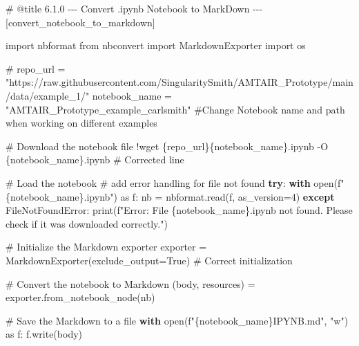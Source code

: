 \documentclass[
  11pt,
  letterpaper,
]{book}
\newenvironment{Shaded}{\begin{snugshade}}{\end{snugshade}}
\newcommand{\BuiltInTok}[1]{\textcolor[rgb]{0.00,0.23,0.31}{#1}}
\newcommand{\CommentTok}[1]{\textcolor[rgb]{0.37,0.37,0.37}{#1}}
\newcommand{\ControlFlowTok}[1]{\textcolor[rgb]{0.00,0.23,0.31}{\textbf{#1}}}
\newcommand{\DecValTok}[1]{\textcolor[rgb]{0.68,0.00,0.00}{#1}}
\newcommand{\ImportTok}[1]{\textcolor[rgb]{0.00,0.46,0.62}{#1}}
\newcommand{\NormalTok}[1]{\textcolor[rgb]{0.00,0.23,0.31}{#1}}
\newcommand{\OperatorTok}[1]{\textcolor[rgb]{0.37,0.37,0.37}{#1}}
\newcommand{\PreprocessorTok}[1]{\textcolor[rgb]{0.68,0.00,0.00}{#1}}
\newcommand{\SpecialCharTok}[1]{\textcolor[rgb]{0.37,0.37,0.37}{#1}}
\newcommand{\SpecialStringTok}[1]{\textcolor[rgb]{0.13,0.47,0.30}{#1}}
\newcommand{\StringTok}[1]{\textcolor[rgb]{0.13,0.47,0.30}{#1}}
\newcommand{\VariableTok}[1]{\textcolor[rgb]{0.07,0.07,0.07}{#1}}
\begin{document}
\label{convert_notebook_to_markdown}
\begin{Shaded}
\begin{Highlighting}[]
\CommentTok{\# @title 6.1.0 {-}{-}{-} Convert .ipynb Notebook to MarkDown {-}{-}{-} [convert\_notebook\_to\_markdown]}

\ImportTok{import}\NormalTok{ nbformat}
\ImportTok{from}\NormalTok{ nbconvert }\ImportTok{import}\NormalTok{ MarkdownExporter}
\ImportTok{import}\NormalTok{ os}

\CommentTok{\# repo\_url = "https://raw.githubusercontent.com/SingularitySmith/AMTAIR\_Prototype/main/data/example\_1/"}
\NormalTok{notebook\_name }\OperatorTok{=} \StringTok{"AMTAIR\_Prototype\_example\_carlsmith"}  \CommentTok{\#Change Notebook name and path when working on different examples}

\CommentTok{\# Download the notebook file}
\OperatorTok{!}\NormalTok{wget \{repo\_url\}\{notebook\_name\}.ipynb }\OperatorTok{{-}}\NormalTok{O \{notebook\_name\}.ipynb  }\CommentTok{\# Corrected line}

\CommentTok{\# Load the notebook}
\CommentTok{\# add error handling for file not found}
\ControlFlowTok{try}\NormalTok{:}
  \ControlFlowTok{with} \BuiltInTok{open}\NormalTok{(}\SpecialStringTok{f"}\SpecialCharTok{\{}\NormalTok{notebook\_name}\SpecialCharTok{\}}\SpecialStringTok{.ipynb"}\NormalTok{) }\ImportTok{as}\NormalTok{ f:}
\NormalTok{    nb }\OperatorTok{=}\NormalTok{ nbformat.read(f, as\_version}\OperatorTok{=}\DecValTok{4}\NormalTok{)}
\ControlFlowTok{except} \PreprocessorTok{FileNotFoundError}\NormalTok{:}
  \BuiltInTok{print}\NormalTok{(}\SpecialStringTok{f"Error: File \textquotesingle{}}\SpecialCharTok{\{}\NormalTok{notebook\_name}\SpecialCharTok{\}}\SpecialStringTok{.ipynb\textquotesingle{} not found. Please check if it was downloaded correctly."}\NormalTok{)}


\CommentTok{\# Initialize the Markdown exporter}
\NormalTok{exporter }\OperatorTok{=}\NormalTok{ MarkdownExporter(exclude\_output}\OperatorTok{=}\VariableTok{True}\NormalTok{)  }\CommentTok{\# Correct initialization}

\CommentTok{\# Convert the notebook to Markdown}
\NormalTok{(body, resources) }\OperatorTok{=}\NormalTok{ exporter.from\_notebook\_node(nb)}

\CommentTok{\# Save the Markdown to a file}
\ControlFlowTok{with} \BuiltInTok{open}\NormalTok{(}\SpecialStringTok{f"}\SpecialCharTok{\{}\NormalTok{notebook\_name}\SpecialCharTok{\}}\SpecialStringTok{IPYNB.md"}\NormalTok{, }\StringTok{"w"}\NormalTok{) }\ImportTok{as}\NormalTok{ f:}
\NormalTok{    f.write(body)}
\end{Highlighting}
\end{Shaded}
\end{document}
